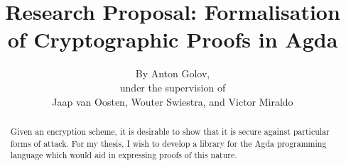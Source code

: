 \documentclass{report}
\title{Research Proposal: Formalisation of Cryptographic Proofs in Agda}
\author{By Anton Golov,\\under the supervision of\\Jaap van Oosten, Wouter Swiestra, and Victor Miraldo}
\begin{document}
    \maketitle

    \begin{abstract}
        Given an encryption scheme, it is desirable to show that it is secure against particular forms of attack.  For
        my thesis, I wish to develop a library for the Agda programming language which would aid in expressing proofs of
        this nature.
    \end{abstract}
    \tableofcontents


    
    
\end{document}
